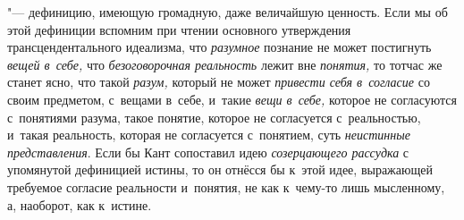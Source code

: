 "--- дефиницию, имеющую громадную, даже величайшую ценность.
Если мы об этой дефиниции вспомним при чтении основного утверждения
трансцендентального идеализма, что
{\em разумное} познание
не может постигнуть {\em вещей в~себе,}
что {\em безоговорочная
реальность} лежит вне
{\em понятия,} то тотчас
же станет ясно, что такой {\em разум,}
который не может
{\em привести себя в~согласие}
со своим предметом, с~вещами в~себе, и~такие
{\em вещи в~себе,}
которое не согласуются с~понятиями разума, такое понятие,
которое не согласуется с~реальностью, и~такая реальность, которая не
согласуется с~понятием, суть
{\em неистинные представления}.
Если бы Кант сопоставил идею
{\em созерцающего рассудка}
с упомянутой дефиницией истины, то он отнёсся бы к~этой идее,
выражающей требуемое согласие реальности и~понятия, не как к~чему-то лишь
мысленному, а, наоборот, как к~истине.

